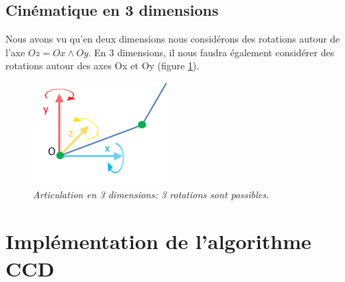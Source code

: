 \documentclass{article}
\begin{document}
\subsection{Cin\'ematique en 3 dimensions}
Nous avons vu qu'en deux dimensions nous consid\'erons des rotations autour de l'axe $Oz = Ox \wedge Oy$.
En 3 dimensions, il nous faudra \'egalement consid\'erer des rotations autour des axes Ox et Oy (figure \ref{rot3d}).
 
  \begin{figure}[htb]
  \centering
    \includegraphics[]{rot3d}
  \caption{
          \textit{Articulation en 3 dimensions: 3 rotations sont possibles.}}
		   \label{rot3d}
\end{figure}
 
\section{Impl\'ementation de l'algorithme CCD}
\label{implementation}
 
\end{document}
